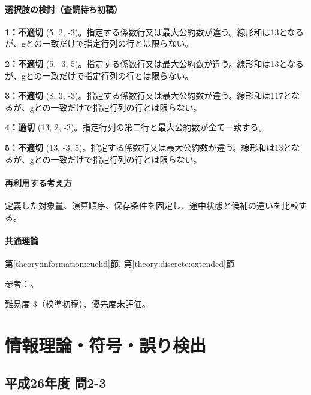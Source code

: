 \paragraph{選択肢の検討（査読待ち初稿）}\mbox{}\par

\noindent\textbf{1：不適切} (5, 2, -3)。指定する係数行又は最大公約数が違う。線形和は13となるが、gとの一致だけで指定行列の行とは限らない。\par

\noindent\textbf{2：不適切} (5, -3, 5)。指定する係数行又は最大公約数が違う。線形和は13となるが、gとの一致だけで指定行列の行とは限らない。\par

\noindent\textbf{3：不適切} (8, 3, -3)。指定する係数行又は最大公約数が違う。線形和は117となるが、gとの一致だけで指定行列の行とは限らない。\par

\noindent\textbf{4：適切} (13, 2, -3)。指定行列の第二行と最大公約数が全て一致する。\par

\noindent\textbf{5：不適切} (13, -3, 5)。指定する係数行又は最大公約数が違う。線形和は13となるが、gとの一致だけで指定行列の行とは限らない。\par

\paragraph{再利用する考え方} 定義した対象量、演算順序、保存条件を固定し、途中状態と候補の違いを比較する。

\paragraph{共通理論} \hyperref[theory:information:euclid]{第\ref*{theory:information:euclid}節}, \hyperref[theory:discrete:extended]{第\ref*{theory:discrete:extended}節}

\par 参考：\cite{mit_discrete2015}。

\par 難易度 3（校準初稿）、優先度未評価。

\section{情報理論・符号・誤り検出}

\subsection{平成26年度 問2-3}
\label{q:h26-reg-basic-2-3}

